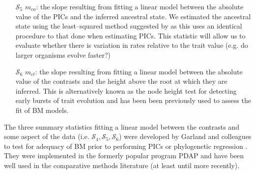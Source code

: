 \documentclass[12pt]{article}
\begin{document}
\begin{enumerate}
\item[$\mathcal{S}_5$] $m_{ca}$: the slope resulting from fitting a linear model between the absolute value of the PICs and the inferred ancestral state. We estimated the ancestral state using the least--squared method suggested by \citep{Felsenstein1985} as this uses an identical procedure to that done when estimating PICs. This statistic will allow us to evaluate whether there is variation in rates relative to the trait value (e.g. do larger organisms evolve faster?)

\item[$\mathcal{S}_6$] $m_{ct}$: the slope resulting from fitting a linear model between the absolute value of the contrasts and the height above the root at which they are inferred. This is alternatively known as the node height test \citep{FreckletonHarvey2006, SlaterPennell} for detecting early bursts of trait evolution and has been been previously used to assess the fit of BM models. 
\end{enumerate}

The three summary statistics fitting a linear model between the contrasts and some aspect of the data (i.e. $\mathcal{S}_4, \mathcal{S}_5, \mathcal{S}_6$) were developed by Garland and colleagues \citep{Garland1992, Garland1993,  Diaz1996} to test for adequacy of BM prior to performing PICs \citep{Felsenstein1985} or phylogenetic regression \citep{Grafen1989}. They were implemented in the formerly popular program PDAP \citep{GarlandPDAP, Midford2005} and have been well used in the comparative methods literature (at least until more recently).  
\end{document}
